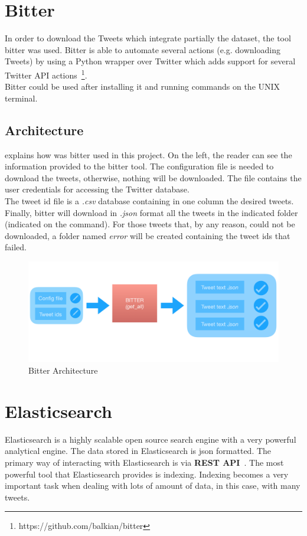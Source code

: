 \section{Bitter}
\label{sec:bitter}
In order to download the Tweets which integrate partially the dataset, the tool bitter was used. Bitter is able to automate several actions (e.g. downloading Tweets) by using a Python wrapper over Twitter which adds support for several Twitter API actions~\footnote{https://github.com/balkian/bitter}.\\
Bitter could be used after installing it and running commands on the UNIX terminal.
\subsection{Architecture}
 explains how was bitter used in this project. On the left, the reader can see the information provided to the bitter tool. The configuration file is needed to download the tweets, otherwise, nothing will be downloaded. The file contains the user credentials for accessing the Twitter database.\\ The tweet id file is a \textit{.csv} database containing in one column the desired tweets. Finally, bitter will download in \textit{.json} format all the tweets in the indicated folder (indicated on the command). For those tweets that, by any reason, could not be downloaded, a folder named \textit{error} will be created containing the tweet ids that failed.
\begin{figure}
	\includegraphics[width=\linewidth]{img/bitter.png}
	\caption{Bitter Architecture}
	\label{fig:bitter}
\end{figure}
\section{Elasticsearch}
Elasticsearch is a highly scalable open source search engine with a very powerful analytical engine. The data stored in Elasticsearch is \ac{json} formatted. The primary way of interacting with Elasticsearch is via \textbf{REST API}~\cite{elastic1}. The most powerful tool that Elasticsearch provides is indexing. Indexing becomes a very important task when dealing with lots of amount of data, in this case, with many tweets.
